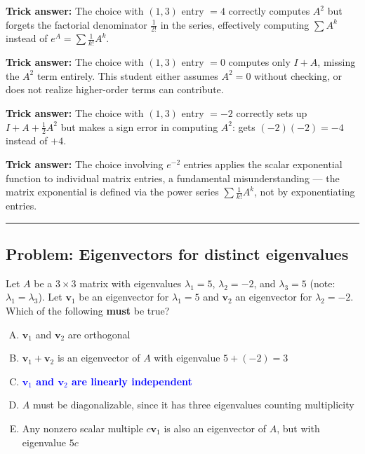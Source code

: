 \documentclass[12pt]{amsart}
\newcommand{\divider}{
  \vspace{-1em}
  \noindent
  \raisebox{-0.15ex}{\textbullet}%
  \hspace{0.5em}%
  \rule[0.5ex]{0.95\textwidth}{1.0pt}%
  \hspace{0.5em}%
  \raisebox{-0.15ex}{\textbullet}%
  \vspace{0em}
}
\begin{document}
\textbf{Trick answer:}
The choice with $(1,3)$ entry $= 4$ correctly computes $A^2$ but
forgets the factorial denominator $\frac{1}{2!}$ in the series,
effectively computing $\sum A^k$ instead of $e^A = \sum \frac{1}{k!}A^k$.

\textbf{Trick answer:}
The choice with $(1,3)$ entry $= 0$ computes only $I + A$, missing
the $A^2$ term entirely. This student either assumes $A^2 = 0$
without checking, or does not realize higher-order terms can contribute.

\textbf{Trick answer:}
The choice with $(1,3)$ entry $= -2$ correctly sets up
$I + A + \frac{1}{2}A^2$ but makes a sign error in computing $A^2$:
gets $(-2)(-2) = -4$ instead of $+4$.

\textbf{Trick answer:}
The choice involving $e^{-2}$ entries applies the scalar exponential
function to individual matrix entries, a fundamental misunderstanding ---
the matrix exponential is defined via the power series $\sum \frac{1}{k!}A^k$,
not by exponentiating entries.

\divider

\subsection*{Problem: Eigenvectors for distinct eigenvalues}

Let $A$ be a $3 \times 3$ matrix with eigenvalues $\lambda_1 = 5$,
$\lambda_2 = -2$, and $\lambda_3 = 5$ (note: $\lambda_1 = \lambda_3$).
Let $\mathbf{v}_1$ be an eigenvector for $\lambda_1 = 5$ and $\mathbf{v}_2$
an eigenvector for $\lambda_2 = -2$.
Which of the following \textbf{must} be true?

\begin{enumerate}[(A)]
\item $\mathbf{v}_1$ and $\mathbf{v}_2$ are orthogonal
\item $\mathbf{v}_1 + \mathbf{v}_2$ is an eigenvector of $A$ with
      eigenvalue $5 + (-2) = 3$
\item \textcolor{blue}{\textbf{$\mathbf{v}_1$ and $\mathbf{v}_2$ are linearly independent}}
\item $A$ must be diagonalizable, since it has three eigenvalues
      counting multiplicity
\item Any nonzero scalar multiple $c\mathbf{v}_1$ is also an eigenvector
      of $A$, but with eigenvalue $5c$
\end{enumerate}
\end{document}
